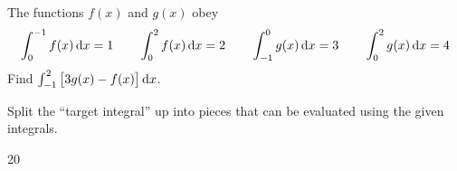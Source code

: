 \begin{Mquestion}[2016Q1]
 The functions $f(x)$ and $g(x)$ obey
\begin{equation*}
\int_0^{-1} f(x)\,\mathrm{d}x = 1 \qquad
\int_0^2 f(x)\,\mathrm{d}x = 2 \qquad
\int_{-1}^0 g(x)\,\mathrm{d}x = 3 \qquad
\int_0^2 g(x)\,\mathrm{d}x = 4
\end{equation*}
Find $\int_{-1}^2 \big[3g(x)-f(x)\big]\,\mathrm{d}x$.
\end{Mquestion}

\begin{hint}
Split the ``target integral'' up into pieces that can be evaluated using the given integrals.
\end{hint}

\begin{answer}
20
\end{answer}

